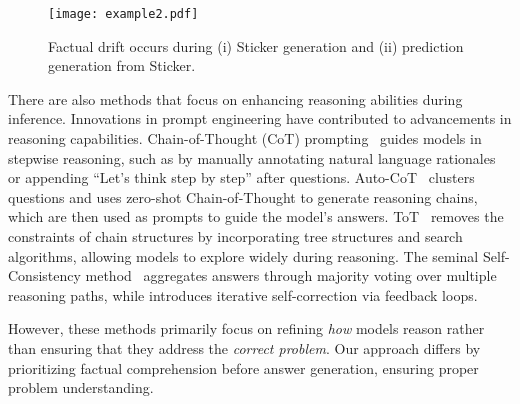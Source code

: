 \begin{figure}[t]
    \centering
    \texttt{[image: example2.pdf]}
    \caption{Factual drift occurs during (i) Sticker generation and (ii) prediction generation from Sticker.}
    \label{fig:example2}
\end{figure}

There are also methods that focus on enhancing reasoning abilities during inference. Innovations in prompt engineering have contributed to advancements in reasoning capabilities. 
Chain-of-Thought (CoT) prompting~\citep{NEURIPS2022_9d560961,kojima2022large} guides models in stepwise reasoning, such as by manually annotating natural language rationales or appending “Let’s think step by step” after questions.
Auto-CoT~\citep{zhang2022automatic} clusters questions and uses zero-shot Chain-of-Thought to generate reasoning chains, which are then used as prompts to guide the model’s answers.
ToT~\citep{yao2023tree} removes the constraints of chain structures by incorporating tree structures and search algorithms, allowing models to explore widely during reasoning. 
The seminal Self-Consistency method~\citep{wang2023selfconsistency} aggregates answers through majority voting over multiple reasoning paths, while \citet{madaan2024self} introduces iterative self-correction via feedback loops. 


However, these methods primarily focus on refining \textit{how} models reason rather than ensuring that they address the \textit{correct problem}. Our approach differs by prioritizing factual comprehension before answer generation, ensuring proper problem understanding.
